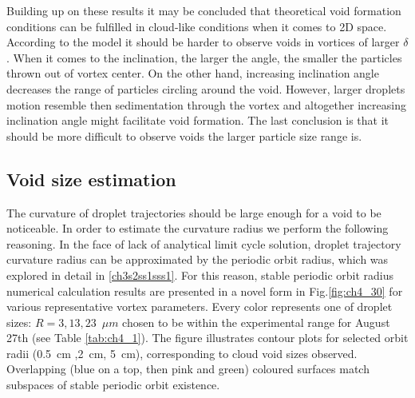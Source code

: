 \documentclass[../main.tex]{subfiles}
\begin{document}
\noindent Building up on these results it may be concluded that theoretical void formation conditions can be fulfilled in cloud-like conditions when it comes to 2D space. According to the model it should be harder to observe voids in vortices of larger $\delta$. When it comes to the inclination, the larger the angle, the smaller the particles thrown out of vortex center. On the other hand, increasing inclination angle decreases the range of particles circling around the void. However, larger droplets motion resemble then sedimentation through the vortex and altogether increasing inclination angle might facilitate void formation. The last conclusion is that it should be more difficult to observe voids the larger particle size range is.\\

\subsection{Void size estimation}
\label{ssec:par}
The curvature of droplet trajectories should be large enough for a void to be noticeable. In order to estimate the curvature radius we perform the following reasoning. In the face of lack of analytical limit cycle solution, droplet trajectory curvature radius can be approximated by the periodic orbit radius, which was explored in detail in \autoref{ch3s2ss1sss1}. For this reason, stable periodic orbit radius numerical calculation results are presented in a novel form in Fig.\ref{fig:ch4_30} for various representative vortex parameters. Every color represents one of droplet sizes: $R=3,13,23$~$\mu m$ chosen to be within the experimental range for August 27th (see Table \ref{tab:ch4_1}). The figure illustrates contour plots for selected orbit radii (0.5~cm ,2~cm, 5~cm), corresponding to cloud void sizes observed. Overlapping (blue on a top, then pink and green) coloured surfaces match subspaces of stable periodic orbit existence. 
\end{document}
